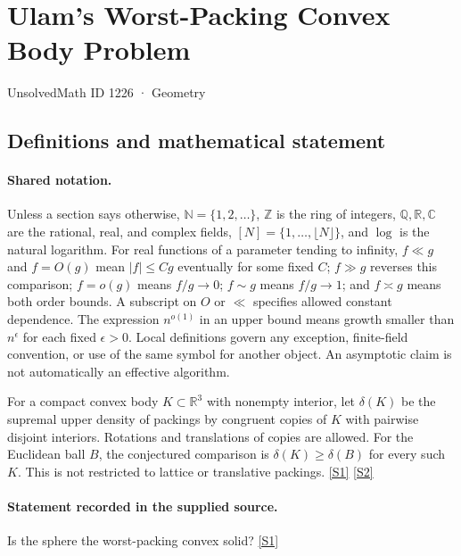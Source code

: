 \documentclass[11pt,a4paper]{article}
\newcommand{\N}{\mathbb{N}}
\newcommand{\Z}{\mathbb{Z}}
\newcommand{\Q}{\mathbb{Q}}
\newcommand{\R}{\mathbb{R}}
\newcommand{\C}{\mathbb{C}}
\newcommand{\sref}[2]{\hyperlink{source:#1:#2}{[S#2]}}
\begin{document}

\setcounter{section}{1225}

\section{Ulam's Worst-Packing Convex Body Problem}\label{1226}

{\small\sffamily UnsolvedMath ID 1226 · Geometry}

\subsection{Definitions and mathematical statement}

\paragraph{Shared notation.}Unless a section says otherwise, $\N=\{1,2,\ldots\}$,
$\Z$ is the ring of integers, $\Q,\R,\C$ are the rational, real, and complex
fields, $[N]=\{1,\ldots,\lfloor N\rfloor\}$, and $\log$ is the natural
logarithm. For real functions of a parameter tending to infinity,
$f\ll g$ and $f=O(g)$ mean $|f|\leq Cg$ eventually for some fixed $C$;
$f\gg g$ reverses this comparison; $f=o(g)$ means $f/g\to0$;
$f\sim g$ means $f/g\to1$; and $f\asymp g$ means both order bounds.
A subscript on $O$ or $\ll$ specifies allowed constant dependence.
The expression $n^{o(1)}$ in an upper bound means growth smaller than
$n^\epsilon$ for each fixed $\epsilon>0$. Local definitions govern any
exception, finite-field convention, or use of the same symbol for another
object. An asymptotic claim is not automatically an effective algorithm.



For a compact convex body $K\subset\R^3$ with nonempty interior, let $\delta(K)$ be the supremal upper density of packings by congruent copies of $K$ with pairwise disjoint interiors. Rotations and translations of copies are allowed. For the Euclidean ball $B$, the conjectured comparison is $\delta(K)\geq\delta(B)$ for every such $K$. This is not restricted to lattice or translative packings. \sref{1226}{1} \sref{1226}{2}

\paragraph{Statement recorded in the supplied source.}
Is the sphere the worst-packing convex solid? \sref{1226}{1}
\end{document}
